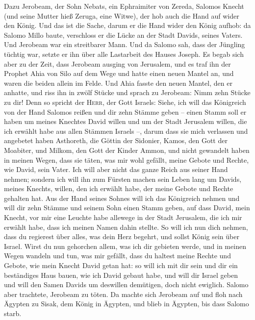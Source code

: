  Dazu Jerobeam, der Sohn Nebats, ein Ephraimiter von
Zereda, Salomos Knecht (und seine Mutter hieß Zeruga, eine Witwe), der
hob auch die Hand auf wider den König.  Und das ist die
Sache, darum er die Hand wider den König aufhob: da Salomo Millo baute,
verschloss er die Lücke an der Stadt Davids, seines Vaters.
 Und Jerobeam war ein streitbarer Mann. Und da Salomo
sah, dass der Jüngling tüchtig war, setzte er ihn über alle Lastarbeit
des Hauses Joseph.  Es begab sich aber zu der Zeit, dass
Jerobeam ausging von Jerusalem, und es traf ihn der Prophet Ahia von
Silo auf dem Wege und hatte einen neuen Mantel an, und waren die beiden
allein im Felde.  Und Ahia fasste den neuen Mantel, den
er anhatte, und riss ihn in zwölf Stücke  und sprach zu
Jerobeam: Nimm zehn Stücke zu dir! Denn so spricht der \textsc{Herr},
der Gott Israels: Siehe, ich will das Königreich von der Hand Salomos
reißen und dir zehn Stämme geben --  einen Stamm soll er
haben um meines Knechtes David willen und um der Stadt Jerusalem willen,
die ich erwählt habe aus allen Stämmen Israels --,  darum
dass sie mich verlassen und angebetet haben Asthoreth, die Göttin der
Sidonier, Kamos, den Gott der Moabiter, und Milkom, den Gott der Kinder
Ammon, und nicht gewandelt haben in meinen Wegen, dass sie täten, was
mir wohl gefällt, meine Gebote und Rechte, wie David, sein Vater.
 Ich will aber nicht das ganze Reich aus seiner Hand
nehmen; sondern ich will ihn zum Fürsten machen sein Leben lang um
Davids, meines Knechts, willen, den ich erwählt habe, der meine Gebote
und Rechte gehalten hat.  Aus der Hand seines Sohnes will
ich das Königreich nehmen und will dir zehn Stämme  und
seinem Sohn einen Stamm geben, auf dass David, mein Knecht, vor mir eine
Leuchte habe allewege in der Stadt Jerusalem, die ich mir erwählt habe,
dass ich meinen Namen dahin stellte.  So will ich nun
dich nehmen, dass du regierest über alles, was dein Herz begehrt, und
sollst König sein über Israel.  Wirst du nun gehorchen
allem, was ich dir gebieten werde, und in meinen Wegen wandeln und tun,
was mir gefällt, dass du haltest meine Rechte und Gebote, wie mein
Knecht David getan hat: so will ich mit dir sein und dir ein beständiges
Haus bauen, wie ich David gebaut habe, und will dir Israel geben
 und will den Samen Davids um deswillen demütigen, doch
nicht ewiglich.  Salomo aber trachtete, Jerobeam zu
töten. Da machte sich Jerobeam auf und floh nach Ägypten zu Sisak, dem
König in Ägypten, und blieb in Ägypten, bis dass Salomo starb.

